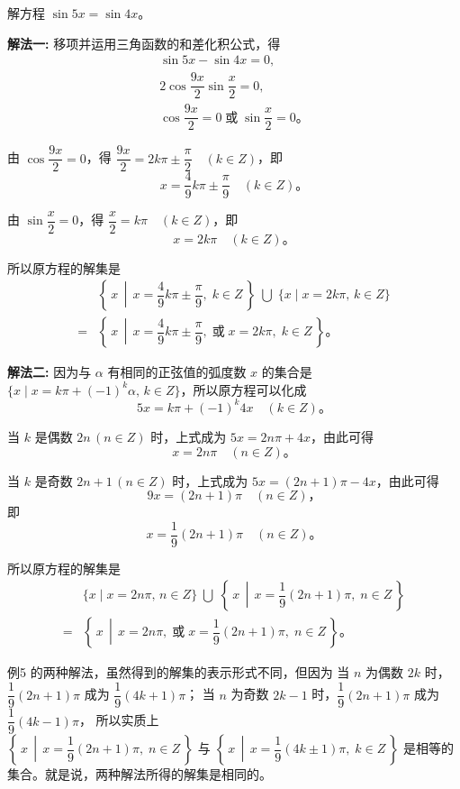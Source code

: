 \liti 解方程 $\sin 5x = \sin 4x$。

\textbf{解法一: } 移项并运用三角函数的和差化积公式，得
\begin{gather*}
    \sin 5x - \sin 4x = 0, \\
    2 \cos\dfrac{9x}{2} \sin\dfrac{x}{2} = 0, \\
    \cos\dfrac{9x}{2} = 0 \;\text{或}\; \sin\dfrac{x}{2} = 0 \text{。}
\end{gather*}

由 $\cos\dfrac{9x}{2} = 0$，得 $\dfrac{9x}{2} = 2k\pi \pm \dfrac{\pi}{2} \quad (k \in Z)$，即
$$ x = \dfrac{4}{9}k\pi \pm \dfrac{\pi}{9} \quad (k \in Z) \text{。}$$

由 $\sin\dfrac{x}{2} = 0$，得 $\dfrac{x}{2} = k\pi \quad (k \in Z)$，即
$$ x = 2k\pi \quad (k \in Z) \text{。} $$

所以原方程的解集是
\begin{align*}
    & \left\{\, x \,\middle|\, x = \dfrac{4}{9}k\pi \pm \dfrac{\pi}{9} ,\; k \in Z \,\right\} \;\bigcup\; \{ x \mid x = 2k\pi ,\, k \in Z \} \\
    = & \left\{\, x \,\middle|\, x = \dfrac{4}{9}k\pi \pm \dfrac{\pi}{9}, \;\text{或}\; x = 2k\pi ,\; k \in Z \,\right\} \text{。}
\end{align*}


\textbf{解法二: } 因为与 $\alpha$ 有相同的正弦值的弧度数 $x$ 的集合是
$\{ x \mid x = k\pi + (-1)^k \alpha ,\, k \in Z \}$，所以原方程可以化成
$$ 5x = k\pi + (-1)^k 4x \quad (k \in Z) \text{。}$$

当 $k$ 是偶数 $2n \, (n \in Z)$ 时，上式成为 $5x = 2n\pi + 4x$，由此可得
$$ x = 2n\pi \quad (n \in Z) \text{。}$$

当 $k$ 是奇数 $2n + 1 \, (n \in Z)$ 时，上式成为 $5x = (2n+1)\pi - 4x$，由此可得
$$ 9x = (2n + 1)\pi \quad (n \in Z) \text{，}$$
即
$$ x = \dfrac{1}{9}(2n + 1)\pi \quad (n \in Z) \text{。} $$

所以原方程的解集是
\begin{align*}
    & \{ x \mid x = 2n\pi ,\, n \in Z \} \;\bigcup\; \left\{\, x \,\middle|\, x = \dfrac{1}{9}(2n + 1)\pi ,\; n \in Z \,\right\} \\
    = & \left\{\, x \,\middle|\, x = 2n\pi, \;\text{或}\; x = \dfrac{1}{9}(2n + 1)\pi ,\; n \in Z \,\right\} \text{。}
\end{align*}

例5 的两种解法，虽然得到的解集的表示形式不同，但因为
当 $n$ 为偶数 $2k$ 时，$\dfrac{1}{9}(2n + 1)\pi$ 成为 $\dfrac{1}{9}(4k + 1)\pi$；
当 $n$ 为奇数 $2k - 1$ 时，$\dfrac{1}{9}(2n + 1)\pi$ 成为 $\dfrac{1}{9}(4k - 1)\pi$，
所以实质上 \\ $\left\{\, x \,\middle|\, x = \dfrac{1}{9}(2n + 1)\pi ,\; n \in Z \,\right\}$
与 $\left\{\, x \,\middle|\, x = \dfrac{1}{9}(4k \pm 1)\pi ,\;  k \in Z \,\right\}$
是相等的集合。就是说，两种解法所得的解集是相同的。


